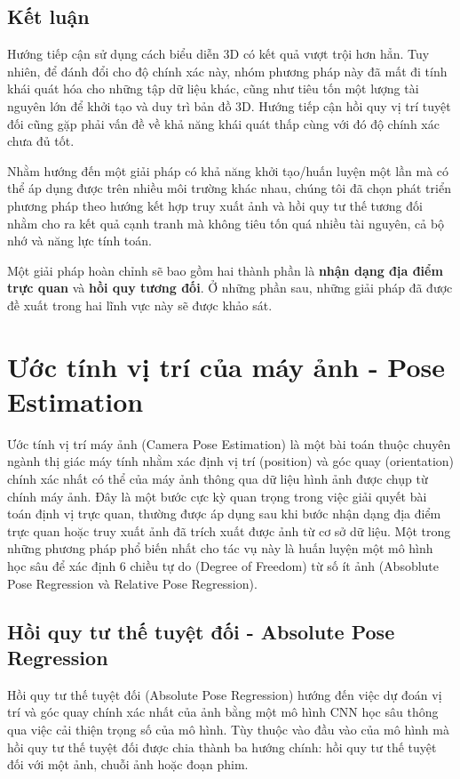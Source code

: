 \subsection{Kết luận}
Hướng tiếp cận sử dụng cách biểu diễn 3D có kết quả vượt trội hơn hẳn. Tuy nhiên, để đánh đổi cho độ chính xác này, nhóm phương pháp này đã mất đi tính khái quát hóa cho những tập dữ liệu khác, cũng như tiêu tốn một lượng tài nguyên lớn để khởi tạo và duy trì bản đồ 3D. Hướng tiếp cận hồi quy vị trí tuyệt đối cũng gặp phải vấn đề về khả năng khái quát thấp cùng với đó độ chính xác chưa đủ tốt.

Nhằm hướng đến một giải pháp có khả năng khởi tạo/huấn luyện một lần mà có thể áp dụng được trên nhiều môi trường khác nhau, chúng tôi đã chọn phát triển phương pháp theo hướng kết hợp truy xuất ảnh và hồi quy tư thế tương đối nhằm cho ra kết quả cạnh tranh mà không tiêu tốn quá nhiều tài nguyên, cả bộ nhớ và năng lực tính toán.

Một giải pháp hoàn chỉnh sẽ bao gồm hai thành phần là \textbf{nhận dạng địa điểm trực quan} và \textbf{hồi quy tương đối}. Ở những phần sau, những giải pháp đã được đề xuất trong hai lĩnh vực này sẽ được khảo sát.




\section{Ước tính vị trí của máy ảnh - Pose Estimation}

Ước tính vị trí máy ảnh (Camera Pose Estimation) là một bài toán thuộc chuyên ngành thị giác máy tính nhằm xác định vị trí (position) và góc quay (orientation) chính xác nhất có thể của máy ảnh thông qua dữ liệu hình ảnh được chụp từ chính máy ảnh. Đây là một bước cực kỳ quan trọng trong việc giải quyết bài toán định vị trực quan, thường được áp dụng sau khi bước nhận dạng địa điểm trực quan hoặc truy xuất ảnh đã trích xuất được ảnh từ cơ sở dữ liệu. Một trong những phương pháp phổ biến nhất cho tác vụ này là huấn luyện một mô hình học sâu để xác định 6 chiều tự do (Degree of Freedom) từ số ít ảnh (Absoblute Pose Regression và Relative Pose Regression).

\subsection{Hồi quy tư thế tuyệt đối - Absolute Pose Regression}

Hồi quy tư thế tuyệt đối (Absolute Pose Regression) hướng đến việc dự đoán vị trí và góc quay chính xác nhất của ảnh bằng một mô hình CNN học sâu thông qua việc cải thiện trọng số của mô hình. Tùy thuộc vào đầu vào của mô hình mà hồi quy tư thế tuyệt đối được chia thành ba hướng chính: hồi quy tư thế tuyệt đối với một ảnh, chuỗi ảnh hoặc đoạn phim.

